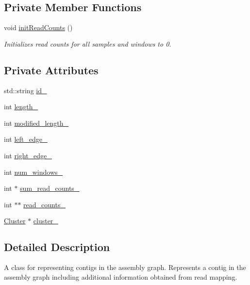 \subsection*{Private Member Functions}
\begin{DoxyCompactItemize}
\item 
void \hyperlink{classContig_ab1d6cdbcc3b964b8a671a214180e163f}{initReadCounts} ()
\begin{DoxyCompactList}\small\item\em Initializes read counts for all samples and windows to 0. \item\end{DoxyCompactList}\end{DoxyCompactItemize}
\subsection*{Private Attributes}
\begin{DoxyCompactItemize}
\item 
std::string \hyperlink{classContig_af2fd571bd7cb1dd9c7c4d0558b19e429}{id\_\-}
\item 
int \hyperlink{classContig_a7b13f9fa4a6e4637bcffa3d53f0f2bce}{length\_\-}
\item 
int \hyperlink{classContig_aa6684a56e15ee58bd476f540d374a533}{modified\_\-length\_\-}
\item 
int \hyperlink{classContig_a7b69a4c23403447450fa33c5d4734445}{left\_\-edge\_\-}
\item 
int \hyperlink{classContig_ae519dc1dad2c15acc493931e84601416}{right\_\-edge\_\-}
\item 
int \hyperlink{classContig_a79d35bdfd6b2150fad6de897e79707eb}{num\_\-windows\_\-}
\item 
int $\ast$ \hyperlink{classContig_aa612a7c9009a74dd27f8585c0685a7f1}{sum\_\-read\_\-counts\_\-}
\item 
int $\ast$$\ast$ \hyperlink{classContig_acefd28d0aa305b2ab14be6e7df92aa5f}{read\_\-counts\_\-}
\item 
\hyperlink{classCluster}{Cluster} $\ast$ \hyperlink{classContig_a6471f93dd7c670423724e1ad8daf119a}{cluster\_\-}
\end{DoxyCompactItemize}


\subsection{Detailed Description}
A class for representing contigs in the assembly graph. Represents a contig in the assembly graph including additional information obtained from read mapping. 

